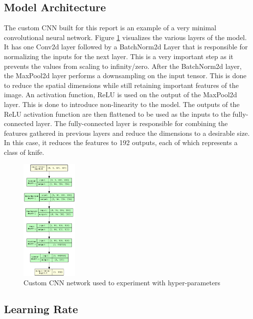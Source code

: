 \documentclass[10pt,twocolumn,letterpaper]{article}
\begin{document}
\subsection{Model Architecture}

The custom CNN built for this report is an example of a very minimal convolutional neural network. Figure
\ref{fig:custom_cnn_chart} visualizes the various layers of the model. It has one Conv2d layer followed by a
BatchNorm2d Layer that is responsible for normalizing the inputs for the next layer. This is a very important step
as it prevents the values from scaling to infinity/zero. After the BatchNorm2d layer, the MaxPool2d layer performs a
downsampling on the input tensor. This is done to reduce the spatial dimensions while still retaining important
features of the image. An activation function, ReLU is used on the output of the MaxPool2d layer. This is done to
introduce non-linearity to the model. The outputs of the ReLU activation function are then flattened to be used as the
inputs to the fully-connected layer. The fully-connected layer is responsible for combining the features gathered in
previous layers and reduce the dimensions to a desirable size. In this case, it reduces the features to 192 outputs,
each of which represents a class of knife.

\begin{figure}[htbp]
  \begin{center}
    \includegraphics[width=0.247\textwidth]{./assets/CustomCNN_visualization.png}
    \captionsetup{justification=centering}
    \caption{Custom CNN network used to experiment with hyper-parameters}
    \label{fig:custom_cnn_chart}
  \end{center}
\end{figure}


\subsection{Learning Rate}
\end{document}
